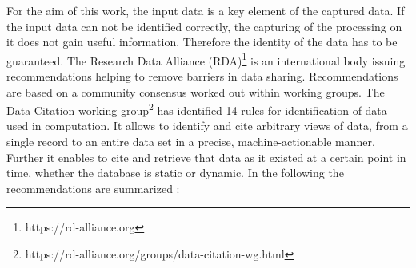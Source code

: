 \documentclass[draft,final]{vutinfth} %
\begin{document}
For the aim of this work, the input data is a key element of the captured data. If the input data can not be identified correctly, the capturing of the processing on it does not gain useful information. Therefore the identity of the data has to be guaranteed. The Research Data Alliance (RDA)\footnote{https://rd-alliance.org} is an international body issuing recommendations helping to remove barriers in data sharing. Recommendations are based on a community consensus worked out within working groups. The Data Citation working group\footnote{https://rd-alliance.org/groups/data-citation-wg.html} has identified 14 rules for identification of data used in computation. It allows to  identify and cite arbitrary views of data, from a single record to an entire data set in a precise, machine-actionable manner. Further it enables to cite and retrieve that data as it existed at a certain point in time, whether the database is static or dynamic. In the following the recommendations are summarized \cite{rauber2016identification}:
\end{document}

